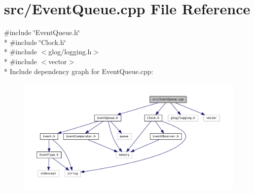 \section{src/\+Event\+Queue.cpp File Reference}
\label{_event_queue_8cpp}
{\ttfamily \#include \char`\"{}Event\+Queue.\+h\char`\"{}}\\*
{\ttfamily \#include \char`\"{}Clock.\+h\char`\"{}}\\*
{\ttfamily \#include $<$glog/logging.\+h$>$}\\*
{\ttfamily \#include $<$vector$>$}\\*
Include dependency graph for Event\+Queue.\+cpp\+:\nopagebreak
\begin{figure}[H]
\begin{center}
\leavevmode
\includegraphics[width=350pt]{_event_queue_8cpp__incl}
\end{center}
\end{figure}
